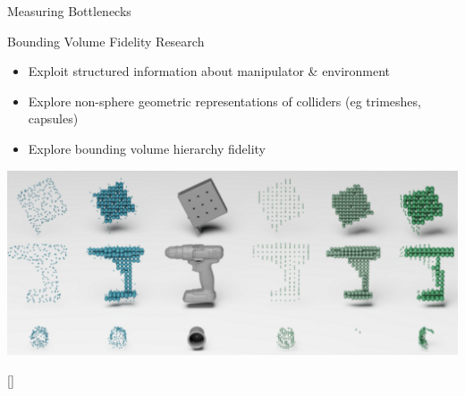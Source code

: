 \documentclass{beamer}
\begin{document}
\begin{frame}{Measuring Bottlenecks}
\end{frame}

\begin{frame}{Bounding Volume Fidelity Research}
\begin{itemize}
\item Exploit structured information about manipulator \& environment
\item Explore non-sphere geometric representations of colliders (eg trimeshes, capsules)
\item Explore bounding volume hierarchy fidelity
\end{itemize}
\centering
\includegraphics[height=0.37\textheight]{./assets/geom_fidelity.png}

[\cite{paper:cuRobo}]
\end{frame}
\end{document}
